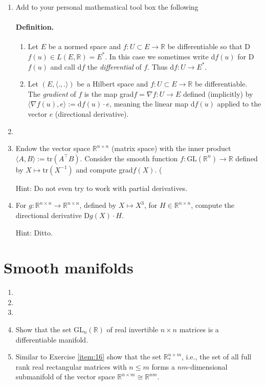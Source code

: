 \documentclass{article}
\begin{document}
\begin{enumerate}[start=9]
  \item Add to your personal mathematical tool box the following
  \paragraph{Definition.}

  \begin{enumerate}
    \item Let $E$ be a normed space and $f:U\subset E\rightarrow\mathbb{R}$ be differentiable so that D$f(u)\in L(E,\mathbb{R})=E^{*}$. In this case we sometimes write d$f(u)$ for D$f(u)$ and call d$f$ the \textit{differential} of $f$. Thus d$f:U\rightarrow E^{*}$.

    \item Let $(E, \langle.,.\rangle)$ be a Hilbert space and $f:U\subset E\rightarrow\mathbb{R}$ be differentiable. The \textit{gradient} of $f$ is the map grad$f=\nabla f:U\rightarrow E$ defined (implicitly) by $\langle\nabla f(u), e\rangle:=\text{d}f(u)\cdot e$, meaning the linear map d$f(u)$ applied to the vector $e$ (directional derivative).
  \end{enumerate}

  \item

  \item Endow the vector space $\mathbb{R}^{n\times n}$ (matrix space) with the inner product $\langle A,B\rangle:=\text{tr}(A^{\top}B)$. Consider the smooth function $f:\text{GL}(\mathbb{R}^{n})\rightarrow\mathbb{R}$ defined by $X\mapsto\text{tr}(X^{-1})$ and compute grad$f(X)$. (

  {\footnotesize Hint: Do not even try to work with partial derivatives.}

  \item For $g:\mathbb{R}^{n\times n}\rightarrow\mathbb{R}^{n\times n}$, defined by $X\mapsto X^{3}$, for $H\in\mathbb{R}^{n\times n}$, compute the directional derivative D$g(X)\cdot H$.

  {\footnotesize Hint: Ditto.}
\end{enumerate}

\section{Smooth manifolds}

\begin{enumerate}[start=13]
  \item
  \item
  \item
  \item \label{item:16} Show that the set GL$_{n}(\mathbb{R})$ of real invertible $n\times n$ matrices is a differentiable manifold.

  \item Similar to Exercise \ref{item:16} show that the set $\mathbb{R}^{n\times m}_{*}$, i.e., the set of all full rank real rectangular matrices with $n\leq m$ forms a $nm$-dimensional submanifold of the vector space $\mathbb{R}^{n\times m}\cong\mathbb{R}^{nm}$.
\end{enumerate}
\end{document}
